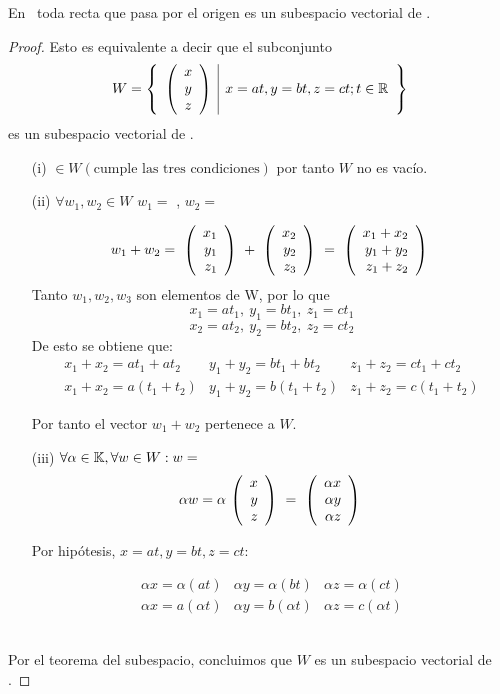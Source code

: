 \begin{theorem}
En \rtres \ toda recta que pasa por el origen es un subespacio vectorial de \rtres.
\end{theorem}
\begin{proof}

Esto es equivalente a decir que el subconjunto $$ W= \left\{\begin{array}{c|c} {\left( \begin{array}{c} x\\ y\\ z \end{array}\right) }&{x=at, y=bt, z=ct ;t\in \mathbb{R}} \end{array} \right\}$$ es un subespacio vectorial de \rtres.

\begin{enumerate}
\item[(i)]  $\in W \left( \mbox{cumple las tres condiciones} \right)$
por tanto $W$ no es vac\'io.

\item[(ii)] $\forall w_1, w_2 \in W$ $w_1=$ , $w_2=$

\[
w_1+w_2=\mbox{ \ensuremath{\left( \begin{array}{r} x_1\\ y_1\\ z_1 \end{array} \right) } }+\mbox{ \ensuremath{\left( \begin{array}{r} x_2\\ y_2\\ z_3 \end{array} \right) } }
=\mbox{ \ensuremath{\left( \begin{array}{r} x_1+x_2\\ y_1+y_2\\ z_1+z_2 \end{array} \right) } }
\]
Tanto $w_1, w_2, w_3$ son elementos de W, por lo que
\[
x_1=at_1,\ y_1=bt_1,\ z_1=ct_1
\]
\[
x_2=at_2,\ y_2=bt_2,\ z_2=ct_2
\]
De esto se obtiene que:
\[
\begin{array}{ccc}
x_1+x_2=at_1+at_2&y_1+y_2=bt_1+bt_2
&z_1+z_2=ct_1+ct_2
\\
x_1+x_2=a\left(t_1+t_2\right)&
y_1+y_2=b\left(t_1+t_2\right)&
z_1+z_2=c\left(t_1+t_2\right)
\end{array}
\]

Por tanto el vector $w_1+w_2$ pertenece a $W$.

\item[(iii)] $\forall \alpha \in \mbox{$\mathbb{K}$}
, \forall w \in W: w=$
\[
\alpha w=\alpha \mbox{ \ensuremath{\left( \begin{array}{r} x\\ y\\ z \end{array} \right) } }=
\mbox{ \ensuremath{\left( \begin{array}{r} \alpha x\\ \alpha y\\ \alpha z \end{array} \right) } }\]

Por hip\'otesis, $x=at, y=bt, z=ct$:

\[
\begin{array}{ccc}
\alpha x=\alpha \left(at\right)&
\alpha y=\alpha \left(bt\right)&
\alpha z=\alpha \left(ct\right)
\\
\alpha x=a\left(\alpha t\right)&
\alpha y=b\left(\alpha t\right)&
\alpha z=c\left(\alpha t\right)
\end{array}
\]

\end{enumerate}
~\\
Por el teorema del subespacio, concluimos que $W$ es un subespacio 
vectorial de \rtres.

\end{proof}


